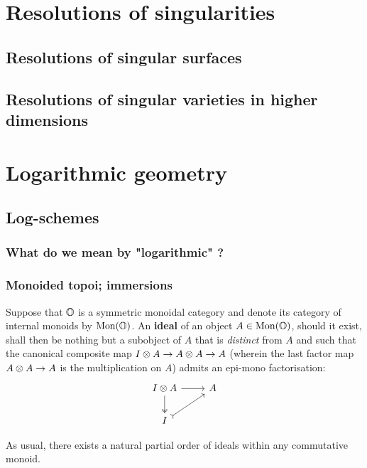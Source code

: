     \section{Resolutions of singularities}
        \subsection{Resolutions of singular surfaces}
        
        \subsection{Resolutions of singular varieties in higher dimensions}
        
    \section{Logarithmic geometry}
        \subsection{Log-schemes}
            \subsubsection{What do we mean by "logarithmic" ?}
            
            \subsubsection{Monoided topoi; immersions}
                \begin{definition}[Ideals] \label{def: ideals_in_symmetric_monoidal_categories}
                    Suppose that $\mathbb{O}$ is a symmetric monoidal category and denote its category of internal monoids by $\mathrm{Mon}(\mathbb{O})$. An \textbf{ideal} of an object $A \in \mathrm{Mon}(\mathbb{O})$, should it exist, shall then be nothing but a subobject of $A$ that is \textit{distinct} from $A$ and such that the canonical composite map $I \tensor A \to A \tensor A \to A$ (wherein the last factor map $A \tensor A \to A$ is the multiplication on $A$) admits an epi-mono factorisation:
                        $$
                            \begin{tikzcd}
                            	{I \tensor A} & A \\
                            	I
                            	\arrow[two heads, from=1-1, to=2-1]
                            	\arrow[tail, from=2-1, to=1-2]
                            	\arrow[from=1-1, to=1-2]
                            \end{tikzcd}
                        $$    
                \end{definition}
                \begin{remark}
                    As usual, there exists a natural partial order of ideals within any commutative monoid.
                \end{remark}
                
